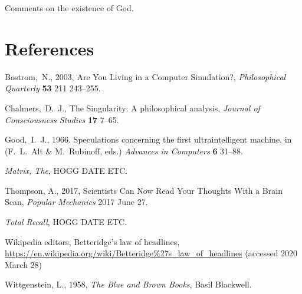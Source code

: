 \documentclass[12pt,letterpaper]{article}
\begin{document}
Comments on the existence of God.

\section*{References}
\begin{trivlist}
\item Bostrom,~N., 2003, Are You Living in a Computer Simulation?,
  \textit{Philosophical Quarterly} \textbf{53} 211 243--255.
\item Chalmers,~D.~J., The Singularity: A philosophical analysis,
  \textit{Journal of Consciousness Studies} \textbf{17} 7--65.
\item Good,~I.~J., 1966. Speculations concerning the first ultraintelligent machine,
  in (F.~L.~Alt \& M.~Rubinoff, eds.) \textit{Advances in Computers} \textbf{6} 31--88.
\item \textit{Matrix, The}, HOGG DATE ETC.
\item Thompson, A., 2017, Scientists Can Now Read Your Thoughts With a Brain Scan,
  \textit{Popular Mechanics} 2017 June 27.
\item \textit{Total Recall}, HOGG DATE ETC.
\item Wikipedia editors, Betteridge's law of headlines,
  \url{https://en.wikipedia.org/wiki/Betteridge%27s_law_of_headlines}
    (accessed 2020 March 28)
\item Wittgenstein, L., 1958, \textit{The Blue and Brown Books},
  Basil Blackwell.
\end{trivlist}
\end{document}
